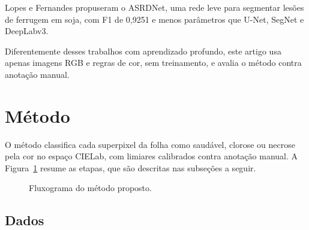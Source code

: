 \documentclass[10pt,a4paper,twocolumn]{article}
\begin{document}
Lopes e Fernandes \cite{lopes2026} propuseram o ASRDNet, uma rede leve
para segmentar lesões de ferrugem em soja, com F1 de 0,9251 e menos
parâmetros que U-Net, SegNet e DeepLabv3.

Diferentemente desses trabalhos com aprendizado profundo, este artigo
usa apenas imagens RGB e regras de cor, sem treinamento, e avalia o
método contra anotação manual.

\section{Método}

O método classifica cada superpixel da folha como saudável, clorose ou necrose pela cor no espaço CIELab, com limiares calibrados contra anotação manual. A Figura~\ref{fig:fluxo} resume as etapas, que são descritas nas subseções a seguir.

\begin{figure}[H]
\centering
{}
\caption{Fluxograma do método proposto.}
\label{fig:fluxo}
\end{figure}

\subsection{Dados}
\end{document}
